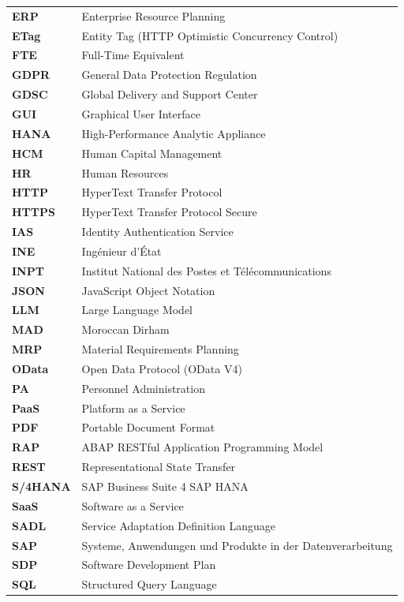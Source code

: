 \begin{longtable}{p{2.8cm} p{12cm}}
\textbf{ERP} & Enterprise Resource Planning \\
\textbf{ETag} & Entity Tag (HTTP Optimistic Concurrency Control) \\
\textbf{FTE} & Full-Time Equivalent \\
\textbf{GDPR} & General Data Protection Regulation \\
\textbf{GDSC} & Global Delivery and Support Center \\
\textbf{GUI} & Graphical User Interface \\
\textbf{HANA} & High-Performance Analytic Appliance \\
\textbf{HCM} & Human Capital Management \\
\textbf{HR} & Human Resources \\
\textbf{HTTP} & HyperText Transfer Protocol \\
\textbf{HTTPS} & HyperText Transfer Protocol Secure \\
\textbf{IAS} & Identity Authentication Service \\
\textbf{INE} & Ing\'enieur d'\'Etat \\
\textbf{INPT} & Institut National des Postes et T\'el\'ecommunications \\
\textbf{JSON} & JavaScript Object Notation \\
\textbf{LLM} & Large Language Model \\
\textbf{MAD} & Moroccan Dirham \\
\textbf{MRP} & Material Requirements Planning \\
\textbf{OData} & Open Data Protocol (OData V4) \\
\textbf{PA} & Personnel Administration \\
\textbf{PaaS} & Platform as a Service \\
\textbf{PDF} & Portable Document Format \\
\textbf{RAP} & ABAP RESTful Application Programming Model \\
\textbf{REST} & Representational State Transfer \\
\textbf{S/4HANA} & SAP Business Suite 4 SAP HANA \\
\textbf{SaaS} & Software as a Service \\
\textbf{SADL} & Service Adaptation Definition Language \\
\textbf{SAP} & Systeme, Anwendungen und Produkte in der Datenverarbeitung \\
\textbf{SDP} & Software Development Plan \\
\textbf{SQL} & Structured Query Language \\

\end{longtable}
